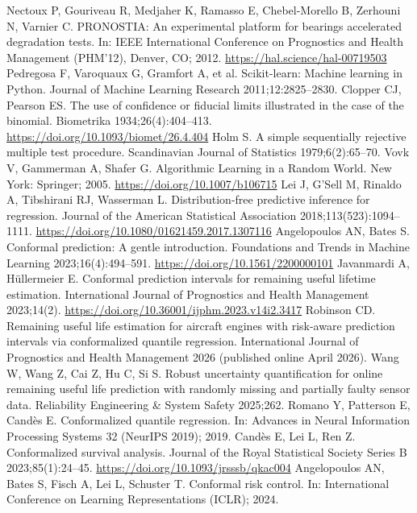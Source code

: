  Nectoux P, Gouriveau R, Medjaher K, Ramasso E, Chebel-Morello B, Zerhouni N, Varnier C. PRONOSTIA: An experimental platform for bearings accelerated degradation tests. In: IEEE International Conference on Prognostics and Health Management (PHM'12), Denver, CO; 2012. \url{https://hal.science/hal-00719503}
 Pedregosa F, Varoquaux G, Gramfort A, et al. Scikit-learn: Machine learning in Python. Journal of Machine Learning Research 2011;12:2825--2830.
 Clopper CJ, Pearson ES. The use of confidence or fiducial limits illustrated in the case of the binomial. Biometrika 1934;26(4):404--413. \url{https://doi.org/10.1093/biomet/26.4.404}
 Holm S. A simple sequentially rejective multiple test procedure. Scandinavian Journal of Statistics 1979;6(2):65--70.
 Vovk V, Gammerman A, Shafer G. Algorithmic Learning in a Random World. New York: Springer; 2005. \url{https://doi.org/10.1007/b106715}
 Lei J, G'Sell M, Rinaldo A, Tibshirani RJ, Wasserman L. Distribution-free predictive inference for regression. Journal of the American Statistical Association 2018;113(523):1094--1111. \url{https://doi.org/10.1080/01621459.2017.1307116}
 Angelopoulos AN, Bates S. Conformal prediction: A gentle introduction. Foundations and Trends in Machine Learning 2023;16(4):494--591. \url{https://doi.org/10.1561/2200000101}
 Javanmardi A, H\"ullermeier E. Conformal prediction intervals for remaining useful lifetime estimation. International Journal of Prognostics and Health Management 2023;14(2). \url{https://doi.org/10.36001/ijphm.2023.v14i2.3417}
 Robinson CD. Remaining useful life estimation for aircraft engines with risk-aware prediction intervals via conformalized quantile regression. International Journal of Prognostics and Health Management 2026 (published online April 2026).
 Wang W, Wang Z, Cai Z, Hu C, Si S. Robust uncertainty quantification for online remaining useful life prediction with randomly missing and partially faulty sensor data. Reliability Engineering \& System Safety 2025;262.
 Romano Y, Patterson E, Cand\`es E. Conformalized quantile regression. In: Advances in Neural Information Processing Systems 32 (NeurIPS 2019); 2019.
 Cand\`es E, Lei L, Ren Z. Conformalized survival analysis. Journal of the Royal Statistical Society Series B 2023;85(1):24--45. \url{https://doi.org/10.1093/jrsssb/qkac004}
 Angelopoulos AN, Bates S, Fisch A, Lei L, Schuster T. Conformal risk control. In: International Conference on Learning Representations (ICLR); 2024.
